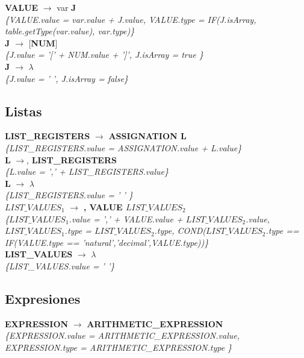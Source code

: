 \documentclass[10pt,a4paper]{article}
\begin{document}
\textbf{VALUE} $\rightarrow$ var \textbf{J} \\
\textit{\{VALUE.value =  var.value + J.value, VALUE.type = IF(J.isArray, table.getType(var.value), var.type)\}} \\

\textbf{J} $\rightarrow$ [\textbf{NUM}] \\
\textit{\{J.value = '[' + NUM.value + ']', J.isArray = true   \}} \\

\textbf{J} $\rightarrow$ $\lambda$   \\
\textit{\{J.value = ' ', J.isArray = false\}} \\

\subsection{Listas}
\textbf{LIST\_REGISTERS} $\rightarrow$ \textbf{ASSIGNATION L} \\
\textit{\{LIST\_REGISTERS.value = ASSIGNATION.value + L.value\}} \\

\textbf{L} $\rightarrow$, \textbf{LIST\_REGISTERS} \\
\textit{\{L.value = ',' + LIST\_REGISTERS.value\}} \\

\textbf{L} $\rightarrow$ $\lambda$\\
\textit{\{LIST\_REGISTERS.value =  ' ' \}}  \\ 

\textbf{$LIST\_VALUES_1$} $\rightarrow$ \textbf{, VALUE $LIST\_VALUES_2$} \\
\textit{\{$LIST\_VALUES_1$.value =  ',' + VALUE.value + $LIST\_VALUES_2$.value, $LIST\_VALUES_1$.type = $LIST\_VALUES_2$.type, COND($LIST\_VALUES_2$.type == IF(VALUE.type == 'natural','decimal',VALUE.type))\}} \\

\textbf{LIST\_VALUES} $\rightarrow$ $\lambda$ \\
\textit{\{LIST\_VALUES.value = ' '\}} \\

\subsection{Expresiones}
\textbf{EXPRESSION} $\rightarrow$ \textbf{ARITHMETIC\_EXPRESSION} \\   
\textit{\{EXPRESSION.value =  ARITHMETIC\_EXPRESSION.value, EXPRESSION.type = ARITHMETIC\_EXPRESSION.type \}}  \\
\end{document}
